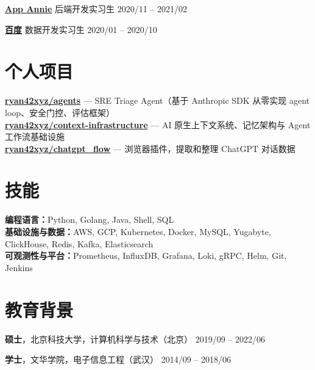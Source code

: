 \documentclass[10.5pt,a4paper]{article}
\newcommand{\company}[1]{{\large\textcolor{CompanyColor}{\textbf{#1}}}}
\begin{document}
\vspace{1pt}
\noindent
\href{https://www.data.ai}{\company{App Annie}} \hfill 后端开发实习生 \hfill 2020/11 -- 2021/02

\vspace{0pt}
\noindent
\href{https://www.baidu.com}{\company{百度}} \hfill 数据开发实习生 \hfill 2020/01 -- 2020/10

\section*{个人项目}
\noindent
\href{https://github.com/ryan42xyz/agents}{\textbf{ryan42xyz/agents}} --- SRE Triage Agent（基于 Anthropic SDK 从零实现 agent loop、安全门控、评估框架） \\
\href{https://github.com/ryan42xyz/context-infrastructure}{\textbf{ryan42xyz/context-infrastructure}} --- AI 原生上下文系统、记忆架构与 Agent 工作流基础设施 \\
\href{https://github.com/ryan42xyz/chatgpt_flow}{\textbf{ryan42xyz/chatgpt\_flow}} --- 浏览器插件，提取和整理 ChatGPT 对话数据

\section*{技能}
\textbf{编程语言：}Python, Golang, Java, Shell, SQL \\
\textbf{基础设施与数据：}AWS, GCP, Kubernetes, Docker, MySQL, Yugabyte, ClickHouse, Redis, Kafka, Elasticsearch \\
\textbf{可观测性与平台：}Prometheus, InfluxDB, Grafana, Loki, gRPC, Helm, Git, Jenkins

\section*{教育背景}
\textbf{硕士}，{\small 北京科技大学，计算机科学与技术（北京）} \hfill {\small 2019/09 -- 2022/06}

\vspace{4pt}
\noindent
\textbf{学士}，{\small 文华学院，电子信息工程（武汉）} \hfill {\small 2014/09 -- 2018/06}
\end{document}
